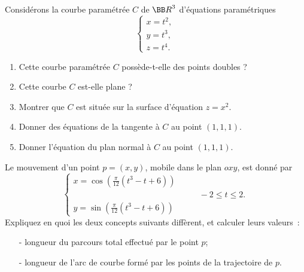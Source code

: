 \documentclass[12pt,french,oneside,a4paper]{memoir} %
\begin{document}
\begin{exo}
Considérons la courbe paramétrée $C$ de ${\BB R}^3$ d'équations paramétriques
\begin{equation*}
\left\{
\begin{array}{l}
x=t^2, \\
y=t^3, \\
z=t^4.
\end{array}
\right.
\end{equation*}
\begin{enumerate}
\item Cette courbe paramétrée $C$ possède-t-elle des points doubles ?
\item Cette courbe $C$ est-elle plane ?
\item Montrer que $C$ est située sur la surface d'équation $z=x^2$.
\item Donner des équations de la tangente à $C$ au point $(1,1,1)$.
\item Donner l'équation du plan normal à $C$ au point $(1,1,1)$.
\end{enumerate}
\end{exo}
\begin{exo}
Le mouvement d'un point $p=(x,y)$, mobile dans le plan $oxy$, est donné par
\begin{equation*}
\left\{
\begin{array}{ll}
\displaystyle{x = \cos \left( \frac{\pi}{12}(t^3-t+6) \right)} & \\
&\qquad -2 \leq t \leq 2. \\
\displaystyle{y = \sin \left( \frac{\pi}{12}(t^3-t+6) \right)} & 
\end{array}
\right.
\end{equation*}
Expliquez en quoi les deux concepts suivants diffèrent, et calculer leurs valeurs~:
\begin{enumerate}
\item[-] longueur du parcours total effectué par le point $p$; 
\item[-] longueur de l'arc de courbe formé par les points de la trajectoire de $p$.
\end{enumerate}
\end{exo}
\end{document}
